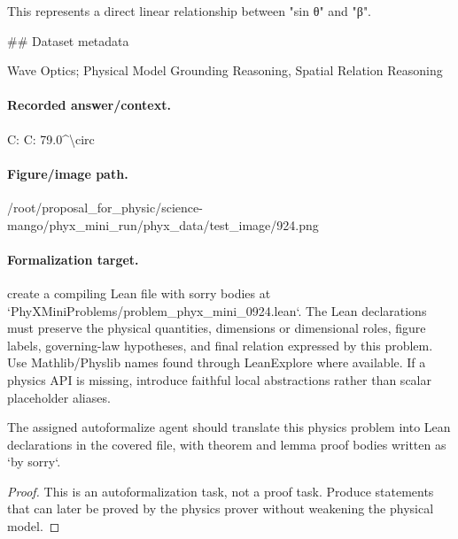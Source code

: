 This represents a direct linear relationship between "sin θ" and "β".

\#\# Dataset metadata

Wave Optics; Physical Model Grounding Reasoning, Spatial Relation Reasoning

\paragraph{Recorded answer/context.}
C: C: 79.0\textasciicircum{}\textbackslash{}circ

\paragraph{Figure/image path.}
/root/proposal\_for\_physic/science-mango/phyx\_mini\_run/phyx\_data/test\_image/924.png

\paragraph{Formalization target.}
create a compiling Lean file with sorry bodies at `PhyXMiniProblems/problem\_phyx\_mini\_0924.lean`. The Lean declarations must preserve the physical quantities, dimensions or dimensional roles, figure labels, governing-law hypotheses, and final relation expressed by this problem.
Use Mathlib/Physlib names found through LeanExplore where available. If a physics API is missing, introduce faithful local abstractions rather than scalar placeholder aliases.

\begin{theorem}
\label{thm:physics:phyx_mini_0924:target}
The assigned autoformalize agent should translate this physics problem into Lean declarations in the covered file, with theorem and lemma proof bodies written as `by sorry`.
\end{theorem}
\begin{proof}
This is an autoformalization task, not a proof task. Produce statements that can later be proved by the physics prover without weakening the physical model.
\end{proof}

